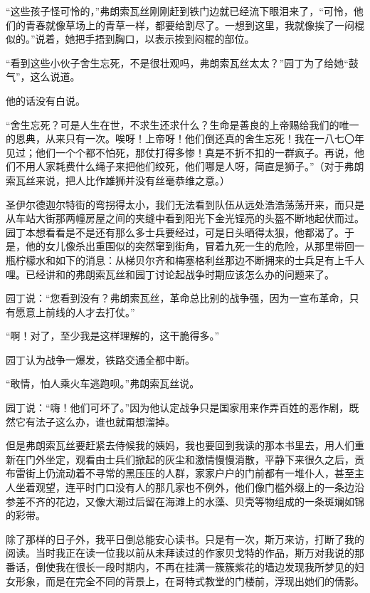 \par “这些孩子怪可怜的，”弗朗索瓦丝刚刚赶到铁门边就已经流下眼泪来了，“可怜，他们的青春就像草场上的青草一样，都要给割尽了。一想到这里，我就像挨了一闷棍似的。”说着，她把手捂到胸口，以表示挨到闷棍的部位。
\par “看到这些小伙子舍生忘死，不是很壮观吗，弗朗索瓦丝太太？”园丁为了给她“鼓气”，这么说道。
\par 他的话没有白说。
\par “舍生忘死？可是人生在世，不求生还求什么？生命是善良的上帝赐给我们的唯一的恩典，从来只有一次。唉呀！上帝呀！他们倒还真的舍生忘死！我在一八七〇年见过；他们一个个都不怕死，那仗打得多惨！真是不折不扣的一群疯子。再说，他们不用人家耗费什么绳子来把他们绞死，他们哪是人呀，简直是狮子。”（对于弗朗索瓦丝来说，把人比作雄狮并没有丝毫恭维之意。）
\par 圣伊尔德迦尔特街的弯拐得太小，我们无法看到队伍从远处浩浩荡荡开来，而只是从车站大街那两幢房屋之间的夹缝中看到阳光下金光锃亮的头盔不断地起伏而过。园丁本想看看是不是还有那么多士兵要经过，可是日头晒得太狠，他都渴了。于是，他的女儿像杀出重围似的突然窜到街角，冒着九死一生的危险，从那里带回一瓶柠檬水和如下的消息：从梯贝尔齐和梅塞格利丝那边不断拥来的士兵足有上千人哩。已经讲和的弗朗索瓦丝和园丁讨论起战争时期应该怎么办的问题来了。
\par 园丁说：“您看到没有？弗朗索瓦丝，革命总比别的战争强，因为一宣布革命，只有愿意上前线的人才去打仗。”
\par “啊！对了，至少我是这样理解的，这干脆得多。”
\par 园丁认为战争一爆发，铁路交通全都中断。
\par “敢情，怕人乘火车逃跑呗。”弗朗索瓦丝说。
\par 园丁说：“嗨！他们可坏了。”因为他认定战争只是国家用来作弄百姓的恶作剧，既然它有法子这么办，谁也就甭想溜掉。
\par 但是弗朗索瓦丝要赶紧去侍候我的姨妈，我也要回到我读的那本书里去，用人们重新在门外坐定，观看由士兵们掀起的灰尘和激情慢慢消散，平静下来很久之后，贡布雷街上仍流动着不寻常的黑压压的人群，家家户户的门前都有一堆仆人，甚至主人坐着观望，连平时门口没有人的那几家也不例外，他们像门槛外缀上的一条边沿参差不齐的花边，又像大潮过后留在海滩上的水藻、贝壳等物组成的一条斑斓如锦的彩带。
\par 除了那样的日子外，我平日倒总能安心读书。只是有一次，斯万来访，打断了我的阅读。当时我正在读一位我以前从未拜读过的作家贝戈特的作品，斯万对我说的那番话，倒使我在很长一段时期内，不再在挂满一簇簇紫花的墙边发现我所梦见的妇女形象，而是在完全不同的背景上，在哥特式教堂的门楼前，浮现出她们的倩影。
